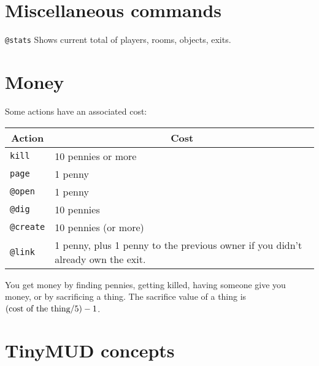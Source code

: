 \section{Miscellaneous commands}
\label{sec:miscellaneous-commands}

\begin{simple}

\item[]
\begin{flushleft}
{\tt @stats}
Shows current total of players, rooms, objects, exits.
\end{flushleft}

\end{simple}

\section{Money}
\label{sec:money}

Some actions have an associated cost:
\begin{center}
\begin{tabular}{|l|p{4in}|}
\hline
\multicolumn{1}{|c|}{{\bf Action}} &
\multicolumn{1}{c|}{{\bf Cost}} \\
\hline
\hline
\hline
{\tt kill} & 10 pennies or more \\
\hline
{\tt page} & 1 penny \\
\hline
{\tt @open} & 1 penny \\
\hline
{\tt @dig} & 10 pennies \\
\hline
{\tt @create} & 10 pennies (or more) \\
\hline
{\tt @link} & 1 penny, plus 1 penny to the previous owner if you
didn't already own the exit. \\
\hline
\end{tabular}
\end{center}

You get money by finding pennies, getting killed, having someone give
you money, or by sacrificing a thing.  The sacrifice value of a thing
is $(\mbox{\rm cost of the thing} / 5 ) - 1$.

\section{TinyMUD concepts}
\label{sec:tinymud-concepts}


